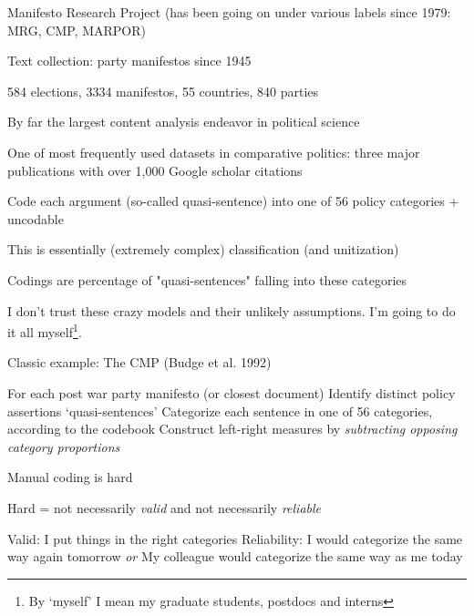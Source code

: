 \documentclass[kp]{foilpack}
\begin{document}

Manifesto Research Project (has been going on under various labels since 1979: MRG, CMP, MARPOR)

 Text collection: party  manifestos since 1945 

	 584 elections, 3334 manifestos, 55 countries,	840 parties 
	 
 By far the largest content analysis endeavor in political science 
	
One of  most frequently used datasets in comparative politics: three major  publications with over 1,000 Google scholar citations




Code each argument (so-called quasi-sentence) into one of 56 policy categories + uncodable

 This is essentially (extremely complex) classification (and unitization)

 Codings are percentage of "quasi-sentences" falling into these categories	 



I don't trust these crazy models and their unlikely assumptions.  I'm going to do it all myself\footnote{By `myself' I mean my graduate students, postdocs and interns}.

Classic example: The CMP (Budge et al. 1992)

For each post war party manifesto (or closest document)
\ita
\itm Identify distinct policy assertions `quasi-sentences'
\itm Categorize each sentence in one of 56 categories, according to the codebook
\itm Construct left-right measures by \textit{subtracting opposing category proportions}
\itz


Manual coding is hard


Hard = not necessarily \textit{valid} and not necessarily \textit{reliable}

\ita
\itm Valid: I put things in the right categories
\itm Reliability: I would categorize the same way again tomorrow \textit{or} My colleague would categorize the same way as me today
\itz

%
%
%
%
%
%
\end{document}
